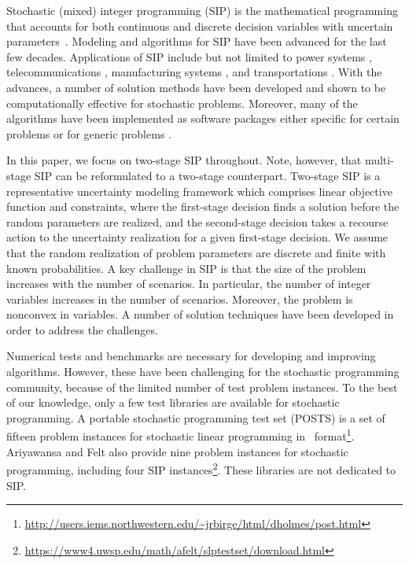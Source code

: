 Stochastic (mixed) integer programming (SIP) is the mathematical programming that accounts for 
both continuous and discrete decision variables with uncertain parameters~\cite{book:BL2011}. 
Modeling and algorithms for SIP have been advanced for the last few decades. Applications of SIP include but not limited to power systems \cite{journal:PO2013,journal:KYZC2017}, telecommunications \cite{journal:SDC1994}, manufacturing systems \cite{journal:SPR1994,journal:AG2004}, and transportations \cite{journal:MW1969,journal:PGM2017,journal:TPP2017,journal:MPT2014}. With the advances, a number of solution methods have been developed and shown to be computationally effective for stochastic problems. Moreover, many of the algorithms have been implemented as software packages either specific for certain problems or for generic problems \cite{SCIP,journal:WWH2012,journal:KZ2015}.

In this paper, we focus on two-stage SIP throughout. Note, however, that multi-stage SIP can be reformulated to a two-stage counterpart. Two-stage SIP is a representative uncertainty modeling framework which comprises linear objective function and constraints, where the first-stage decision finds a solution before the 
random parameters are realized, and the second-stage decision takes a recourse action to the uncertainty realization for a given first-stage decision. We assume that the random realization of problem parameters are discrete and finite with known probabilities.
A key challenge in SIP is that the size of
the problem increases with the number of scenarios. In particular, the number of integer variables increases in the number of scenarios. Moreover, the problem is nonconvex in variables. A number of solution techniques have been developed in order to address the challenges.

Numerical tests and benchmarks are necessary for developing and improving algorithms. However,
these have been challenging for the stochastic programming community, because of the limited number of test problem instances. To the best of our knowledge, only a few test libraries are available for stochastic programming. A portable stochastic programming test set (POSTS) \cite{POSTS} is a set of fifteen problem instances for 
stochastic linear programming in \smps\ format\footnote{\url{http://users.iems.northwestern.edu/~jrbirge/html/dholmes/post.html}}. Ariyawansa and Felt \cite{journal:AF2004} also provide nine problem instances for stochastic programming, including four SIP instances\footnote{\url{https://www4.uwsp.edu/math/afelt/slptestset/download.html}}. These libraries are not dedicated to SIP. 

